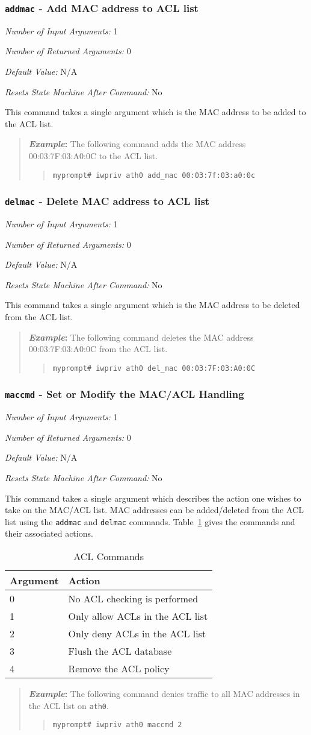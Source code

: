 \documentclass[10pt,fullpage]{article}
\newcommand{\mytt}[1]{{\texttt{#1}}}
\newcommand{\bv}{\begin{verse}}
\newcommand{\ev}{\end{verse}}
\newcommand{\cmd}[1]{{\texttt{myprompt\# #1}}}
\newcommand{\argdesc}[4]{\begin{description}
\itemsep -6pt
\item \textit{Number of Input Arguments:} #1
\item \textit{Number of Returned Arguments:} #2
\item \textit{Default Value:} #3
\item \textit{Resets State Machine After Command:} #4
\end{description}
}
\newenvironment{example}{\begin{quote}\textbf{\textit{Example}:}}{\end{quote}}
\begin{document}
\subsubsection{\mytt{addmac} - Add MAC address to ACL list}
\argdesc{1}{0}{N/A}{No}
This command takes a single argument which is the MAC address to be
added to the ACL list.
\begin{example}
  The following command adds the MAC address 00:03:7F:03:A0:0C to the
  ACL list.
  \bv
  \cmd{iwpriv ath0 add\_mac 00:03:7f:03:a0:0c}
  \ev
\end{example}

\subsubsection{\mytt{delmac} - Delete MAC address to ACL list}
\argdesc{1}{0}{N/A}{No}
This command takes a single argument which is the MAC address to be
deleted from the ACL list.
\begin{example}
  The following command deletes the MAC address 00:03:7F:03:A0:0C from
  the ACL list.
  \bv
  \cmd{iwpriv ath0 del\_mac 00:03:7F:03:A0:0C}
  \ev
\end{example}

\subsubsection{\mytt{maccmd} - Set or Modify the MAC/ACL Handling}
\argdesc{1}{0}{N/A}{No}
This command takes a single argument which describes the action one
wishes to take on the MAC/ACL list.  MAC addresses can be
added/deleted from the ACL list using the \mytt{addmac} and
\mytt{delmac} commands.  Table~\ref{tab:maccmd} gives the commands and
their associated actions.
\begin{table}[h*]
  \centering
  \begin{tabular}{|l|l|} \hline
    Argument & Action \\ \hline
    0 & No ACL checking is performed \\
    1 & Only allow ACLs in the ACL list \\
    2 & Only deny ACLs in the ACL list \\
    3 & Flush the ACL database \\
    4 & Remove the ACL policy \\ \hline
  \end{tabular}
  \caption{ACL Commands}
  \label{tab:maccmd}
\end{table}
\begin{example}
  The following command denies traffic to all MAC addresses in the ACL
  list on \mytt{ath0}.
  \bv
  \cmd{iwpriv ath0 maccmd 2}
  \ev
\end{example}
\end{document}
